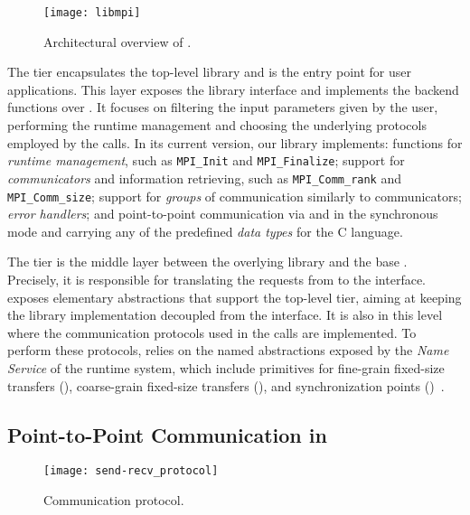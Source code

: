 	\begin{figure}[t]
		\centering
		\texttt{[image: libmpi]}
		\caption{Architectural overview of \lwmpi.}
		\label{figure:libmpi-arch}
		\vspace{-15pt}
	\end{figure}

	The \libmpi tier encapsulates the top-level library and is the
	entry point for user applications.
	This layer exposes the library interface and implements the backend
	functions over \mputil. It focuses on filtering
	the input parameters given by the user, performing the
	runtime management and choosing the underlying protocols employed by
	the \mpi calls.
	In its current version, our library implements: functions for
	\textit{runtime management}, such as \texttt{MPI\_Init} and
	\texttt{MPI\_Finalize}; support for \textit{communicators} and
	information retrieving, such as \texttt{MPI\_Comm\_rank} and
	\texttt{MPI\_Comm\_size}; support for \textit{groups} of communication
	similarly to communicators;	\textit{error handlers}; and point-to-point
	communication via \mpisend and \mpirecv in the synchronous mode and
	carrying any of the predefined \textit{data types} for the C language.

	The \mputil tier is the middle layer between the overlying library and
	the base \os. Precisely, it is responsible for translating the requests
	from \libmpi to the \nanvix interface. \mputil exposes elementary
	abstractions that support the top-level tier, aiming at keeping the
	library implementation decoupled from the \os interface. It is also
	in this level where the communication protocols used in the \mpi calls
	are implemented.
	To perform these protocols, \mputil relies on the named \ipc
	abstractions exposed by the \textit{Name Service} of the \nanvix
	runtime system, which include
	primitives for fine-grain fixed-size transfers (\mailbox),
	coarse-grain fixed-size transfers (\portal), and
	synchronization points (\sync)~\cite{Souto2020}.

\subsection{Point-to-Point Communication in \lwmpi}
\label{sec:lwbmpi-sendrecv}

	\begin{figure}[b]
		\centering
		\texttt{[image: send-recv\_protocol]}
		\caption{Communication protocol.}
		\label{figure:comm-protocol}
	\end{figure}

